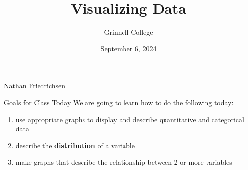 \documentclass{beamer}
\title[STA-209]{Visualizing Data}
\subtitle{}
\author{Grinnell College}
\date{September 6, 2024}
\begin{document}
\begin{frame}
  \titlepage
  \centering Nathan Friedrichsen
\end{frame}

\begin{frame}{Goals for Class Today}
We are going to learn how to do the following today:

\begin{enumerate}
    \item use appropriate graphs to display and describe quantitative and categorical data
    \item describe the \textbf{distribution} of a variable
    \item make graphs that describe the relationship between 2 or more variables
\end{enumerate}
\end{frame}
\end{document}
